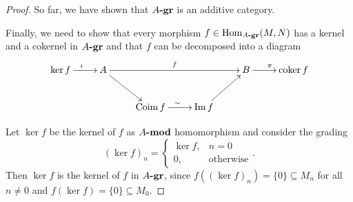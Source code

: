 \begin{proof}
    So far, we have shown that $A\textrm{\textup{\textbf{-gr}}}$ is an additive category.

    Finally, we need to show that every morphism $f \in \operatorname{Hom}_{A\textrm{\textup{\textbf{-gr}}}}(M, N)$ has a kernel and a cokernel in $A\textrm{\textup{\textbf{-gr}}}$ and that $f$ can be decomposed into a diagram
    \[\xymatrix{
            \ker f \ar[r]^{\iota} & A \ar[rrr]^{f} \ar[rd] & & & B \ar[r]^{\pi} & \coker f \\
            & & \coim f \ar[r]^{\sim} & \im f  \ar[ur] & & 
    }\]

    Let $\ker f$ be the kernel of $f$ as $A\textrm{\textup{\textbf{-mod}}}$ homomorphism and consider the grading
    \[
        (\ker f)_n = 
        \begin{cases}
            \ker f, & n=0 \\
            0, & \text{otherwise}
        \end{cases}.
    \]
    Then $\ker f$ is the kernel of $f$ in $A\textrm{\textup{\textbf{-gr}}}$, since $f\left((\ker f)_n\right) = \{0\} \subseteq M_n$ for all $n\neq0$ and $f\left(\ker f\right)= \{0\} \subseteq M_0$.

\end{proof}